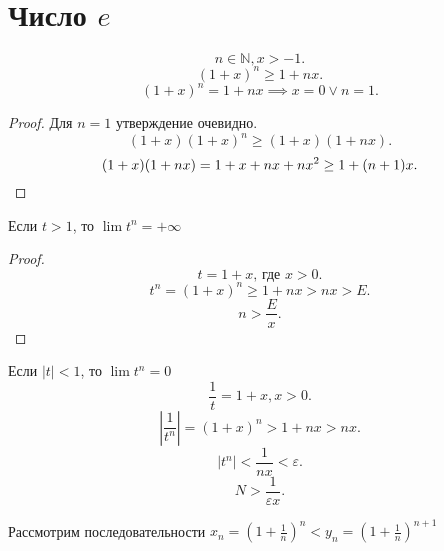 \documentclass[11pt, oneside]{article}   	%
\begin{document}
\section{Число $e$}
\begin{theorem}
    \[ n\in \mathbb{N}, x>-1 .\]
    \[ (1+x)^{n}\ge 1+nx .\]
    \[ (1+x)^{n}=1+nx \implies x=0\lor n=1 .\] 
    \begin{proof}
        Для $n=1$ утверждение очевидно.\\
        \[ (1+x)(1+x)^{n} \ge (1+x)(1+nx) .\]
        \[ (1+x)(1+nx)= 1+x+nx+nx^2 \ge 1+(n+1)x . \qedhere\] 
    \end{proof}
\end{theorem}
\begin{tlemma}
    Если $t>1$, то  $\lim t^{n} = +\infty$ 
    \begin{proof}
        \[ t = 1+x\text{, где $x>0$} .\]
        \[ t^{n} = (1+x)^{n} \ge 1+nx>nx>E .\]
        \[ n>\frac{E}{x} .\] 
    \end{proof}
\end{tlemma}
\begin{tlemma}
    Если $|t|<1$, то  $\lim t^{n} = 0$ 
    \[ \frac{1}{t} = 1+x, x>0 .\]
    \[ \left|\frac{1}{t^{n}}\right|=(1+x)^{n}>1+nx>nx .\]
    \[ \left|t^n\right| < \frac{1}{nx}<\varepsilon .\]
    \[ N > \frac{1}{\varepsilon x} .\] 
\end{tlemma}
Рассмотрим последовательности $x_n = \left(1+\frac{1}{n}\right)^{n} < y_n = (1+\frac{1}{n})^{n+1}$ 
\end{document}
